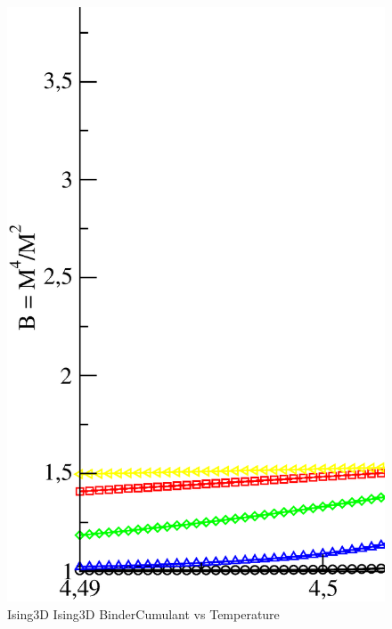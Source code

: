 \begin{figure}[!htpb]
  \centering
  \includegraphics[width=\textwidth]{./plots/Ising3D/Ising3D_BinderCumulant_vs_Temperature.eps}
  \caption{Ising3D Ising3D BinderCumulant vs Temperature}
\end{figure}

